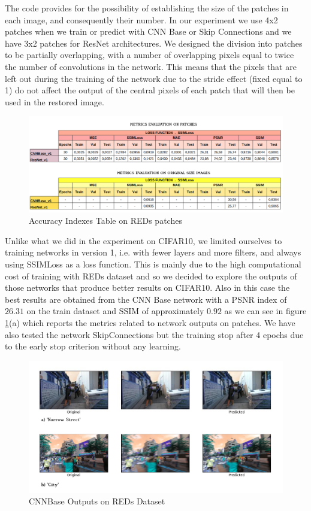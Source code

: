 \documentclass[12pt,a4paper]{report}
\begin{document}
The code provides for the possibility of establishing the size of the patches in each image, and consequently their number. In our experiment we use 4x2 patches when we train or predict with CNN Base or Skip Connections and we have 3x2 patches for ResNet architectures. We designed the division into patches to be partially overlapping, with a number of overlapping pixels equal to twice the number of convolutions in the network. This means that the pixels that are left out during the training of the network due to the stride effect (fixed equal to 1) do not affect the output of the central pixels of each patch that will then be used in the restored image.

\begin{figure}[hptb]
\centering
\includegraphics[scale=0.45]{REDs_table.png} 
\caption{Accuracy Indexes Table on REDs patches}
\label{REDs_table}
\end{figure}

Unlike what we did in the experiment on CIFAR10, we limited ourselves to training networks in version 1, i.e. with fewer layers and more filters, and always using SSIMLoss as a loss function. This is mainly due to the high computational cost of training with REDs dataset and so we decided to explore the outputs of those networks that produce better results on CIFAR10. Also in this case the best results are obtained from the CNN Base network with a PSNR index of $26.31$ on the train dataset and SSIM of approximately $0.92$ as we can see in figure \ref{REDs_table}(a) which reports the metrics related to network outputs on patches. We have also tested the network SkipConnections but the training stop after 4 epochs due to the early stop criterion without any learning.

\begin{figure}[hptb]
\centering
\includegraphics[scale=0.48]{REDs_CNNBase_Outputs.png} 
\caption{CNNBase Outputs on REDs Dataset}
\label{REDs_outputs_CNNBase}
\end{figure}
\end{document}
